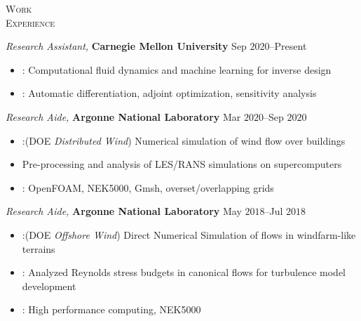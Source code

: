 \documentclass[10pt]{article}
\begin{document}
\vspace{-1.5em}
\begin{multicols}{2}
\textsc{Work \\ Experience}
\columnbreak

\textit{Research Assistant,} \textbf{Carnegie Mellon University} \hfill Sep $2020$--Present

\vspace{-1.75em}
\begin{itemize}[label=-]
    \setlength\itemsep{-0.25em}
    \setlength{\itemindent}{-1.50em}
    \item {}: Computational fluid dynamics and machine learning for inverse design
    \item {}: Automatic differentiation, adjoint optimization, sensitivity analysis
\end{itemize}
\vspace{-2.0em}

\vspace{0.5em}
%
\textit{Research Aide,} \textbf{Argonne National Laboratory} \hfill Mar $2020$--Sep $2020$

\vspace{-1.75em}
\begin{itemize}[label=-]
    \setlength\itemsep{-0.25em}
    \setlength{\itemindent}{-1.50em}
    \item {}:(DOE \textit{Distributed Wind}) Numerical simulation of wind flow over buildings
    \item {} Pre-processing and analysis of LES/RANS simulations on supercomputers
    \item {}: OpenFOAM, NEK5000, Gmsh, overset/overlapping grids
\end{itemize}
\vspace{-2.0em}

\vspace{0.5em}
%
\textit{Research Aide,} \textbf{Argonne National Laboratory} \hfill May $2018$--Jul $2018$

\vspace{-1.75em}
\begin{itemize}[label=-]
    \setlength\itemsep{-0.25em}
    \setlength{\itemindent}{-1.50em}
    \item {}:(DOE \textit{Offshore Wind}) Direct Numerical Simulation of flows in windfarm-like terrains
    \item {}: Analyzed Reynolds stress budgets in canonical flows for turbulence model development
    \item {}: High performance computing, NEK5000
\end{itemize}
\vspace{-2.0em}


\end{multicols}
\end{document}
